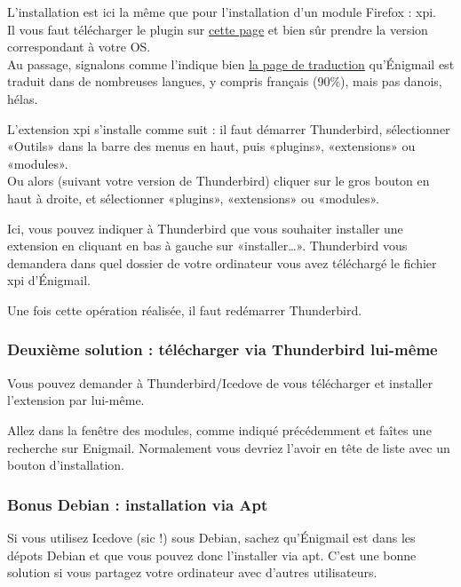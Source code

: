 L'installation est ici la même que pour l'installation d'un module
Firefox : xpi.\\Il vous faut télécharger le plugin sur
\href{https://www.enigmail.net/download/}{cette page} et bien sûr
prendre la version correspondant à votre OS.\\Au passage, signalons
comme l'indique bien
\href{http://beta.babelzilla.org/projects/p/Enigmail/}{la page de
traduction} qu'Énigmail est traduit dans de nombreuses langues, y
compris français (90\%), mais pas danois, hélas.

L'extension xpi s'installe comme suit : il faut démarrer Thunderbird,
sélectionner «Outils» dans la barre des menus en haut, puis «plugins»,
«extensions» ou «modules».\\Ou alors (suivant votre version de
Thunderbird) cliquer sur le gros bouton en haut à droite, et
sélectionner «plugins», «extensions» ou «modules».

Ici, vous pouvez indiquer à Thunderbird que vous souhaiter installer une
extension en cliquant en bas à gauche sur «installer\ldots{}».
Thunderbird vous demandera dans quel dossier de votre ordinateur vous
avez téléchargé le fichier xpi d'Énigmail.

Une fois cette opération réalisée, il faut redémarrer Thunderbird.

\subsubsection{Deuxième solution : télécharger via Thunderbird lui-même}\label{deuxiuxe8me-solution-tuxe9luxe9charger-via-thunderbird-lui-muxeame}

Vous pouvez demander à Thunderbird/Icedove de vous télécharger et
installer l'extension par lui-même.

Allez dans la fenêtre des modules, comme indiqué précédemment et faîtes
une recherche sur Enigmail. Normalement vous devriez l'avoir en tête de
liste avec un bouton d'installation.

\subsubsection{Bonus Debian : installation via Apt}\label{bonus-debian-installation-via-apt}

Si vous utilisez Icedove (sic !) sous Debian, sachez qu'Énigmail est
dans les dépots Debian et que vous pouvez donc l'installer via apt.
C'est une bonne solution si vous partagez votre ordinateur avec d'autres
utilisateurs.

